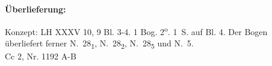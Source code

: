 \begin{ledgroupsized}[r]{120mm}
\footnotesize 
\pstart 
\noindent\textbf{\"{U}berlieferung:}
\pend
\end{ledgroupsized}
\begin{ledgroupsized}[r]{114mm}
\footnotesize 
\pstart \parindent -6mm
%
Konzept: 
LH XXXV 10, 9 Bl. 3-4. 1 Bog. 2\textsuperscript{o}. 1\, S. auf Bl. 4.
Der Bogen überliefert ferner  N.~28\textsubscript{1}, N.~28\textsubscript{2}, N.~28\textsubscript{5} und N.~5.
\\
Cc 2, Nr. 1192 A-B
\pend
\end{ledgroupsized}
%

